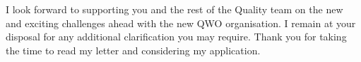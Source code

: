 \documentclass[11pt,a4paper]{letter}
\begin{document}
{%
%
%
 
 

I look forward to supporting you and the rest of the Quality team on the new and exciting challenges ahead with the new QWO organisation. I remain at your disposal for any additional clarification you may require. Thank you for taking the time to read my letter and considering my application.

}
\end{document}
